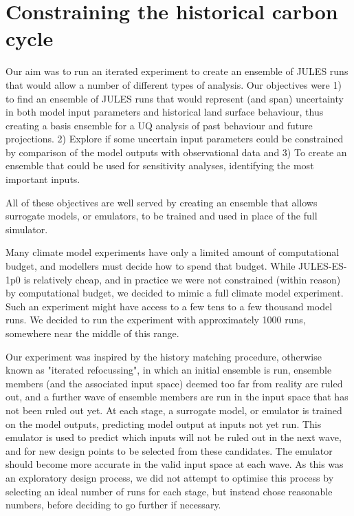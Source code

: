 \documentclass[gmd, manuscript]{copernicus}
\begin{document}
\section{Constraining the historical carbon cycle}

Our aim was to run an iterated experiment to create an ensemble of JULES runs that would allow  a number of different types of analysis. Our objectives were 1) to find an ensemble of JULES runs that would represent (and span) uncertainty in both model input parameters and historical land surface behaviour, thus creating a basis ensemble for a UQ analysis of past behaviour and future projections. 2) Explore if some uncertain input parameters could be constrained by comparison of the model outputs with observational data and 3) To create an ensemble that could be used for sensitivity analyses, identifying the most important inputs. 

All of these objectives are well served by creating an ensemble that allows surrogate models, or emulators, to be trained and used in place of the full simulator.

Many climate model experiments have only a limited amount of computational budget, and modellers must decide how to spend that budget. While JULES-ES-1p0 is relatively cheap, and in practice we were not constrained (within reason) by computational budget, we decided to mimic a full climate model experiment. Such an experiment might have access to a few tens to a few thousand model runs. We decided to run the experiment with approximately 1000 runs, somewhere near the middle of this range.

Our experiment was inspired by the history matching procedure, otherwise known as "iterated refocussing", in which an initial ensemble is run, ensemble members (and the associated input space) deemed too far from reality are ruled out, and a further wave of ensemble members are run in the input space that has not been ruled out yet. At each stage, a surrogate model, or emulator is trained on the model outputs, predicting model output at inputs not yet run. This emulator is used to predict which inputs will not be ruled out in the next wave, and for new design points to be selected from these candidates. The emulator should become more accurate in the valid input space at each wave. As this was an exploratory design process, we did not attempt to optimise this process by selecting an ideal number of runs for each stage, but instead chose reasonable numbers, before deciding to go further if necessary.
\end{document}
